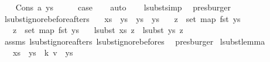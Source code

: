 \begin{isabellebody}
\isamarkupfalse%
\isanewline
\ \ \isamarkupfalse%
\ {\isacharparenleft}{\kern0pt}Cons\ a\ ys{}{\isacharparenright}{\kern0pt}\isanewline
\ \ \isamarkupfalse%
\ \isamarkupfalse%
\ {\isacharquery}{\kern0pt}case\isanewline
\ \ \isamarkupfalse%
\ auto\isanewline
\ \ \isamarkupfalse%
\ lsubst{\isacharunderscore}{\kern0pt}simp\ \isamarkupfalse%
\ presburger\isanewline
{}\isamarkupfalse%
%
\endisatagproof
{\isafoldproof}%
%
\isadelimproof
\isanewline
%
\endisadelimproof
\isanewline
\isanewline
{}\isamarkupfalse%
\ lsubst{\isacharunderscore}{\kern0pt}ignore{\isacharunderscore}{\kern0pt}beforeafters{\isacharcolon}{\kern0pt}\isanewline
\ \ \ {\isachardoublequoteopen}xs\ {\isacharequal}{\kern0pt}\ ys{}\ {\isacharat}{\kern0pt}\ ys{}\ {\isacharat}{\kern0pt}\ ys{}{\isachardoublequoteclose}\isanewline
\ \ \ {\isachardoublequoteopen}z\ {\isasymnotin}\ set\ {\isacharparenleft}{\kern0pt}map\ fst\ ys{}{\isacharparenright}{\kern0pt}{\isachardoublequoteclose}\isanewline
\ \ \ {\isachardoublequoteopen}z\ {\isasymnotin}\ set\ {\isacharparenleft}{\kern0pt}map\ fst\ ys{}{\isacharparenright}{\kern0pt}{\isachardoublequoteclose}\isanewline
\ \ \ {\isachardoublequoteopen}lsubst\ xs\ z\ {\isacharequal}{\kern0pt}\ lsubst\ ys{}\ z{\isachardoublequoteclose}\isanewline
%
\isadelimproof
\ \ %
\endisadelimproof
%
\isatagproof
{}\isamarkupfalse%
\ assms{\isacharparenleft}{\kern0pt}{}{\isacharcomma}{\kern0pt}{}{\isacharcomma}{\kern0pt}{}{\isacharparenright}{\kern0pt}\ lsubst{\isacharunderscore}{\kern0pt}ignore{\isacharunderscore}{\kern0pt}afters\ lsubst{\isacharunderscore}{\kern0pt}ignore{\isacharunderscore}{\kern0pt}befores\ \isamarkupfalse%
\ presburger%
\endisatagproof
{\isafoldproof}%
%
\isadelimproof
\isanewline
%
\endisadelimproof
\isanewline
\isanewline
{}\isamarkupfalse%
\ lsubst{\isacharunderscore}{\kern0pt}lemma{}{\isacharcolon}{\kern0pt}\isanewline
\ \ \ {\isachardoublequoteopen}xs\ {\isacharequal}{\kern0pt}\ ys{}\ {\isacharat}{\kern0pt}\ {\isacharbrackleft}{\kern0pt}{\isacharparenleft}{\kern0pt}k{\isacharcomma}{\kern0pt}\ v{\isacharparenright}{\kern0pt}{\isacharbrackright}{\kern0pt}\ {\isacharat}{\kern0pt}\ ys{}{\isachardoublequoteclose}\isanewline

\end{isabellebody}
